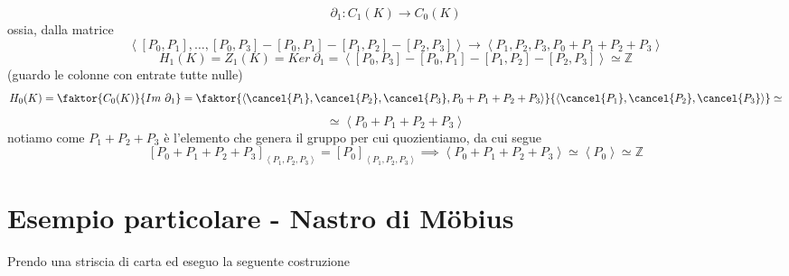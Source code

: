 \documentclass[a4paper]{report}
\newcommand{\Z}{\ensuremath{\mathbb{Z}}}
\newcommand{\ra}{\ensuremath{\rightarrow}}
\newcommand{\gen}[1]{\ensuremath{\left<{#1}\right>}}
\begin{document}
\[
    \partial_1:C_1(K)\ra C_0(K)
\]
ossia, dalla matrice
\[
    \gen{[P_0,P_1],\dots,[P_0,P_3]-[P_0,P_1]-[P_1,P_2]-[P_2,P_3]}\ra\gen{P_1,P_2,P_3,P_0+P_1+P_2+P_3}
\]
\[
    H_1(K)=Z_1(K)=Ker\ \partial_1=\gen{[P_0,P_3]-[P_0,P_1]-[P_1,P_2]-[P_2,P_3]}\simeq \Z
\]
(guardo le colonne con entrate tutte nulle)
\[
    H_0(K)=\faktor{C_0(K)}{Im\ \partial_1}=\faktor{\gen{\cancel{P_1},\cancel{P_2},\cancel{P_3},P_0+P_1+P_2+P_3}}{\gen{\cancel{P_1},\cancel{P_2},\cancel{P_3}}}\simeq
\]
\[
    \simeq\gen{P_0+P_1+P_2+P_3}
\]
notiamo come $P_1+P_2+P_3$ è l'elemento che genera il gruppo per cui quozientiamo, da cui segue
\[
    [P_0+P_1+P_2+P_3]_{\gen{P_1,P_2,P_3}}=[P_0]_{\gen{P_1,P_2,P_3}}\implies\gen{P_0+P_1+P_2+P_3}\simeq\gen{P_0}\simeq\Z
\]
\pagebreak
\section{Esempio particolare - Nastro di Möbius}
Prendo una striscia di carta ed eseguo la seguente costruzione
\end{document}
